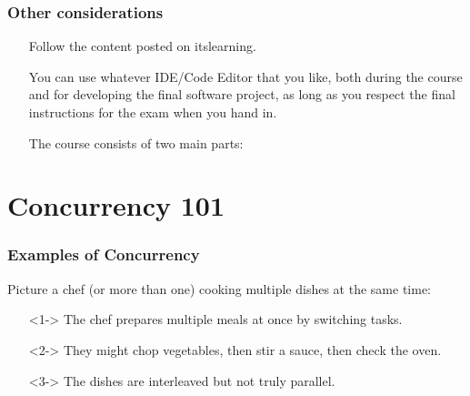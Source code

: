 \documentclass[xcolor={dvipsnames,svgnames},aspectratio=169]{beamer}
\begin{document}
\begin{frame}[fragile]
  \frametitle{Other considerations}
  \begin{itemize}
  \item[\faBook] Follow the content posted on itslearning.
  \item[\faBook] You can use whatever IDE/Code Editor that you like, both during the
    course and for developing the final software project, as long as you respect
    the final instructions for the exam when you hand in.
  \item[\faBook] The course consists of two main parts:
  \end{itemize}
\end{frame}

\section{Concurrency 101}

\begin{frame}[fragile]
  \frametitle{Examples of Concurrency}

  Picture a chef (or more than one) cooking multiple dishes at the same time:

  \begin{itemize}
  \item[\faBook]<1-> The chef prepares multiple meals at once by switching tasks.
  \item[\faBook]<2-> They might chop vegetables, then stir a sauce, then check the oven.
  \item[\faBook]<3-> The dishes are interleaved but not truly parallel.
  \end{itemize}
\end{frame}
\end{document}
